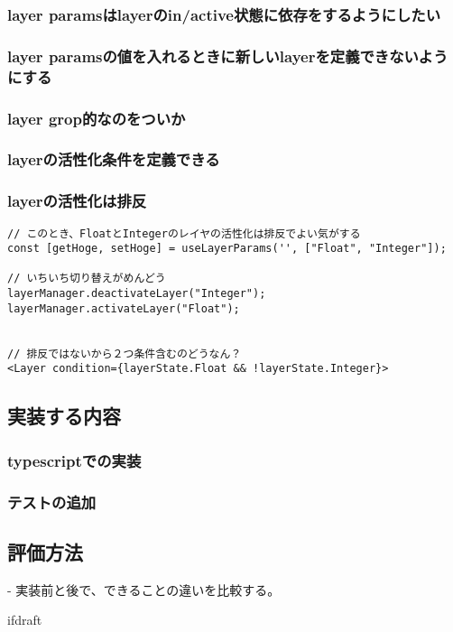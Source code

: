 \documentclass{jsarticle}
\begin{document}
\subsubsection{layer paramsはlayerのin/active状態に依存をするようにしたい}

\subsubsection{layer paramsの値を入れるときに新しいlayerを定義できないようにする}

\subsubsection{layer grop的なのをついか}

\subsubsection{layerの活性化条件を定義できる}

\subsubsection{layerの活性化は排反}
\begin{lstlisting}[caption=hoge,label=fuga]
// このとき、FloatとIntegerのレイヤの活性化は排反でよい気がする
const [getHoge, setHoge] = useLayerParams('', ["Float", "Integer"]);

// いちいち切り替えがめんどう
layerManager.deactivateLayer("Integer");
layerManager.activateLayer("Float");


// 排反ではないから２つ条件含むのどうなん？
<Layer condition={layerState.Float && !layerState.Integer}>
\end{lstlisting}

\subsection{実装する内容}

\subsubsection{typescriptでの実装}

\subsubsection{テストの追加}


\subsection{評価方法}
- 実装前と後で、できることの違いを比較する。

\expandafter\ifx\csname ifdraft\endcsname\relax
\end{document}
